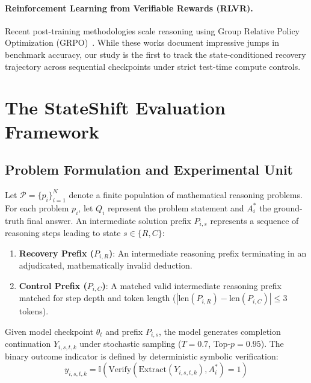 \documentclass[11pt]{article}
\begin{document}
\paragraph{Reinforcement Learning from Verifiable Rewards (RLVR).}
Recent post-training methodologies scale reasoning using Group Relative Policy Optimization (GRPO)~\cite{Shao2024Deepseekmath, DeepSeek2025Deepseek, Luo2025Deepscaler}. While these works document impressive jumps in benchmark accuracy, our study is the first to track the state-conditioned recovery trajectory across sequential checkpoints under strict test-time compute controls.

\section{The StateShift Evaluation Framework}

\subsection{Problem Formulation and Experimental Unit}
Let $\mathcal{P} = \{p_i\}_{i=1}^N$ denote a finite population of mathematical reasoning problems. For each problem $p_i$, let $Q_i$ represent the problem statement and $A_i^*$ the ground-truth final answer. An intermediate solution prefix $P_{i,s}$ represents a sequence of reasoning steps leading to state $s \in \{R, C\}$:
\begin{enumerate}
    \item \textbf{Recovery Prefix ($P_{i,R}$)}: An intermediate reasoning prefix terminating in an adjudicated, mathematically invalid deduction.
    \item \textbf{Control Prefix ($P_{i,C}$)}: A matched valid intermediate reasoning prefix matched for step depth and token length ($|\text{len}(P_{i,R}) - \text{len}(P_{i,C})| \le 3$ tokens).
\end{enumerate}

Given model checkpoint $\theta_t$ and prefix $P_{i,s}$, the model generates completion continuation $Y_{i,s,t,k}$ under stochastic sampling ($T=0.7$, Top-$p=0.95$). The binary outcome indicator is defined by deterministic symbolic verification:
\begin{equation}
y_{i,s,t,k} = \mathbb{I}\left(\text{Verify}\left(\text{Extract}(Y_{i,s,t,k}), A_i^*\right) = 1\right)
\end{equation}
\end{document}
